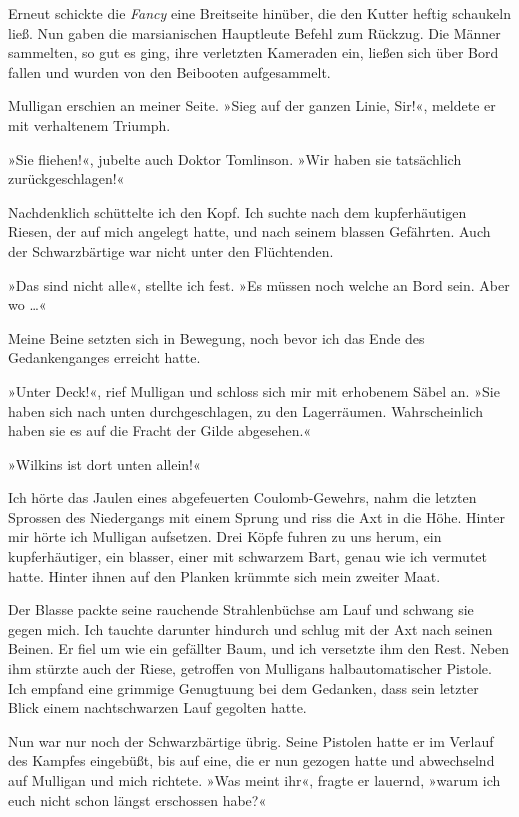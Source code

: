 Erneut schickte die \emph{Fancy} eine Breitseite hinüber, die den
Kutter heftig schaukeln ließ. Nun gaben die marsianischen
Hauptleute Befehl zum Rückzug. Die Männer sammelten, so gut es
ging, ihre verletzten Kameraden ein, ließen sich über Bord fallen
und wurden von den Beibooten aufgesammelt.

Mulligan erschien an meiner Seite. »Sieg auf der ganzen Linie,
Sir!«, meldete er mit verhaltenem Triumph.

»Sie fliehen!«, jubelte auch Doktor Tomlinson. »Wir haben sie
tatsächlich zurückgeschlagen!«

Nachdenklich schüttelte ich den Kopf. Ich suchte nach dem
kupferhäutigen Riesen, der auf mich angelegt hatte, und nach seinem
blassen Gefährten. Auch der Schwarzbärtige war nicht unter den
Flüchtenden.

»Das sind nicht alle«, stellte ich fest. »Es müssen noch welche an
Bord sein. Aber wo \ldots{}«

Meine Beine setzten sich in Bewegung, noch bevor ich das Ende des
Gedankenganges erreicht hatte.

»Unter Deck!«, rief Mulligan und schloss sich mir mit erhobenem
Säbel an. »Sie haben sich nach unten durchgeschlagen, zu den
Lagerräumen. Wahrscheinlich haben sie es auf die Fracht der Gilde
abgesehen.«

»Wilkins ist dort unten allein!«

Ich hörte das Jaulen eines abgefeuerten Coulomb-Gewehrs, nahm die
letzten Sprossen des Niedergangs mit einem Sprung und riss die Axt
in die Höhe. Hinter mir hörte ich Mulligan aufsetzen. Drei Köpfe
fuhren zu uns herum, ein kupferhäutiger, ein blasser, einer mit
schwarzem Bart, genau wie ich vermutet hatte. Hinter ihnen auf den
Planken krümmte sich mein zweiter Maat.

Der Blasse packte seine rauchende Strahlenbüchse am Lauf und
schwang sie gegen mich. Ich tauchte darunter hindurch und schlug
mit der Axt nach seinen Beinen. Er fiel um wie ein gefällter Baum,
und ich versetzte ihm den Rest. Neben ihm stürzte auch der Riese,
getroffen von Mulligans halbautomatischer Pistole. Ich empfand eine
grimmige Genugtuung bei dem Gedanken, dass sein letzter Blick einem
nachtschwarzen Lauf gegolten hatte.

Nun war nur noch der Schwarzbärtige übrig. Seine Pistolen hatte er
im Verlauf des Kampfes eingebüßt, bis auf eine, die er nun gezogen
hatte und abwechselnd auf Mulligan und mich richtete. »Was meint
ihr«, fragte er lauernd, »warum ich euch nicht schon längst
erschossen habe?«

